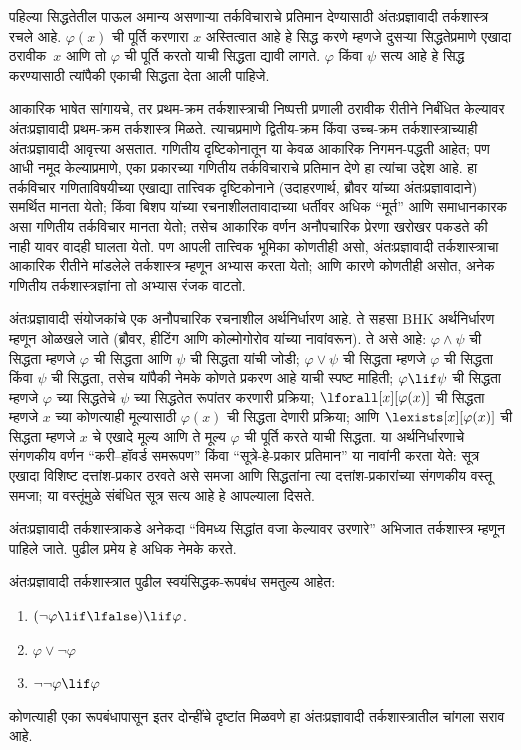 पहिल्या सिद्धतेतील पाऊल अमान्य असणाऱ्या तर्कविचाराचे प्रतिमान देण्यासाठी
अंतःप्रज्ञावादी तर्कशास्त्र रचले आहे. $\varphi(x)$ ची पूर्ति करणारा $x$ अस्तित्वात
आहे हे सिद्ध करणे म्हणजे दुसऱ्या सिद्धतेप्रमाणे एखादा ठरावीक~$x$ आणि तो
$\varphi$ ची पूर्ति करतो याची सिद्धता द्यावी लागते. $\varphi$ किंवा $\psi$ सत्य आहे हे
सिद्ध करण्यासाठी त्यांपैकी एकाची सिद्धता देता आली पाहिजे.

आकारिक भाषेत सांगायचे, तर प्रथम-क्रम तर्कशास्त्राची निष्पत्ती प्रणाली
ठरावीक रीतीने निर्बंधित केल्यावर अंतःप्रज्ञावादी प्रथम-क्रम तर्कशास्त्र मिळते.
त्याचप्रमाणे द्वितीय-क्रम किंवा उच्च-क्रम तर्कशास्त्राच्याही अंतःप्रज्ञावादी
आवृत्त्या असतात. गणितीय दृष्टिकोनातून या केवळ आकारिक निगमन-पद्धती आहेत; पण
आधी नमूद केल्याप्रमाणे, एका प्रकारच्या गणितीय तर्कविचाराचे प्रतिमान देणे हा
त्यांचा उद्देश आहे. हा तर्कविचार गणिताविषयीच्या एखाद्या तात्त्विक दृष्टिकोनाने
(उदाहरणार्थ, ब्रौवर यांच्या अंतःप्रज्ञावादाने) समर्थित मानता येतो; किंवा
बिशप यांच्या रचनाशीलतावादाच्या धर्तीवर अधिक “मूर्त” आणि समाधानकारक असा
गणितीय तर्कविचार मानता येतो; तसेच आकारिक वर्णन अनौपचारिक प्रेरणा खरोखर
पकडते की नाही यावर वादही घालता येतो. पण आपली तात्त्विक भूमिका कोणतीही असो,
अंतःप्रज्ञावादी तर्कशास्त्राचा आकारिक रीतीने मांडलेले तर्कशास्त्र म्हणून
अभ्यास करता येतो; आणि कारणे कोणतीही असोत, अनेक गणितीय तर्कशास्त्रज्ञांना तो
अभ्यास रंजक वाटतो.

अंतःप्रज्ञावादी संयोजकांचे एक अनौपचारिक रचनाशील अर्थनिर्धारण आहे. ते सहसा
BHK अर्थनिर्धारण म्हणून ओळखले जाते (ब्रौवर, हीटिंग आणि कोल्मोगोरोव यांच्या
नावांवरून). ते असे आहे: $\varphi \land \psi$ ची सिद्धता म्हणजे $\varphi$ ची सिद्धता
आणि $\psi$ ची सिद्धता यांची जोडी; $\varphi \lor \psi$ ची सिद्धता म्हणजे $\varphi$ ची
सिद्धता किंवा $\psi$ ची सिद्धता, तसेच यांपैकी नेमके कोणते प्रकरण आहे याची स्पष्ट
माहिती; $\varphi \lif \psi$ ची सिद्धता म्हणजे $\varphi$ च्या सिद्धतेचे $\psi$ च्या
सिद्धतेत रूपांतर करणारी प्रक्रिया; $\lforall[x][\varphi(x)]$ ची सिद्धता म्हणजे
$x$ च्या कोणत्याही मूल्यासाठी $\varphi(x)$ ची सिद्धता देणारी प्रक्रिया; आणि
$\lexists[x][\varphi(x)]$ ची सिद्धता म्हणजे $x$ चे एखादे मूल्य आणि ते मूल्य $\varphi$
ची पूर्ति करते याची सिद्धता. या अर्थनिर्धारणाचे संगणकीय वर्णन
“करी--हॉवर्ड समरूपण” किंवा “सूत्रे-हे-प्रकार प्रतिमान” या नावांनी करता
येते: सूत्र एखादा विशिष्ट दत्तांश-प्रकार ठरवते असे समजा आणि
सिद्धतांना त्या दत्तांश-प्रकारांच्या संगणकीय वस्तू समजा; या वस्तूंमुळे संबंधित
सूत्र सत्य आहे हे आपल्याला दिसते.

अंतःप्रज्ञावादी तर्कशास्त्राकडे अनेकदा “विमध्य सिद्धांत वजा केल्यावर उरणारे”
अभिजात तर्कशास्त्र म्हणून पाहिले जाते. पुढील प्रमेय हे अधिक नेमके करते.
\begin{thm}
अंतःप्रज्ञावादी तर्कशास्त्रात पुढील स्वयंसिद्धक-रूपबंध समतुल्य आहेत:
\begin{enumerate}
\item $(\lnot \varphi \lif \lfalse) \lif \varphi$.
\item $\varphi \lor \lnot \varphi$
\item $\lnot \lnot \varphi \lif \varphi$
\end{enumerate}
\end{thm}
कोणत्याही एका रूपबंधापासून इतर दोन्हींचे दृष्टांत मिळवणे हा अंतःप्रज्ञावादी
तर्कशास्त्रातील चांगला सराव आहे.


